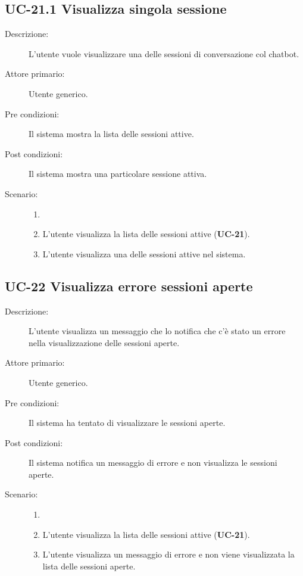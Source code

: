 \subsection{UC-21.1 Visualizza singola sessione}
\begin{description}
    \item[Descrizione:] L'utente vuole visualizzare una delle sessioni di conversazione col chatbot.
    \item[Attore primario:] Utente generico.
    \item[Pre condizioni:] Il sistema mostra la lista delle sessioni attive.
        \item[Post condizioni:] Il sistema mostra una particolare sessione attiva.
    \item[Scenario:] 
    \begin{enumerate}
        \item[]
        \item L'utente visualizza la lista delle sessioni attive (\textbf{UC-21}).
        \item L'utente visualizza una delle sessioni attive nel sistema.
    \end{enumerate}
\end{description}

\subsection{UC-22 Visualizza errore sessioni aperte }
\begin{description}
    \item[Descrizione:] L'utente visualizza un messaggio che lo notifica che c'è stato un errore nella visualizzazione delle sessioni aperte.
    \item[Attore primario:] Utente generico.
    \item[Pre condizioni:] Il sistema ha tentato di visualizzare le sessioni aperte.
    \item[Post condizioni:] Il sistema notifica un messaggio di errore e non visualizza le sessioni aperte.
    \item[Scenario:] 
    \begin{enumerate}
        \item[]
        \item L'utente visualizza la lista delle sessioni attive (\textbf{UC-21}).
        \item L'utente visualizza un messaggio di errore e non viene visualizzata la lista delle sessioni aperte.
    \end{enumerate}
\end{description}

